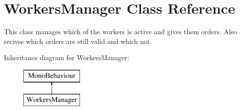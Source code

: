 \hypertarget{class_workers_manager}{}\section{Workers\+Manager Class Reference}
\label{class_workers_manager}


This class manages which of the workers is active and gives them orders. Also recives which orders are still valid and which not.  


Inheritance diagram for Workers\+Manager\+:\begin{figure}[H]
\begin{center}
\leavevmode
\includegraphics[height=2.000000cm]{class_workers_manager}
\end{center}
\end{figure}
